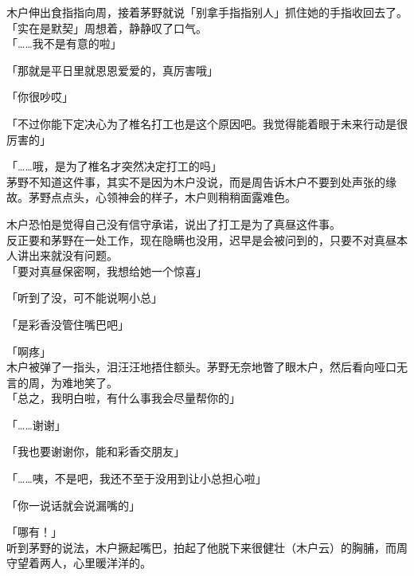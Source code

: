 木户伸出食指指向周，接着茅野就说「别拿手指指别人」抓住她的手指收回去了。「实在是默契」周想着，静静叹了口气。\\

「……我不是有意的啦」

「那就是平日里就恩恩爱爱的，真厉害哦」

「你很吵哎」

「不过你能下定决心为了椎名打工也是这个原因吧。我觉得能着眼于未来行动是很厉害的」

「……哦，是为了椎名才突然决定打工的吗」\\

茅野不知道这件事，其实不是因为木户没说，而是周告诉木户不要到处声张的缘故。茅野点点头，心领神会的样子，木户则稍稍面露难色。

木户恐怕是觉得自己没有信守承诺，说出了打工是为了真昼这件事。\\

反正要和茅野在一处工作，现在隐瞒也没用，迟早是会被问到的，只要不对真昼本人讲出来就没有问题。\\

「要对真昼保密啊，我想给她一个惊喜」

「听到了没，可不能说啊小总」

「是彩香没管住嘴巴吧」

「啊疼」\\

木户被弹了一指头，泪汪汪地捂住额头。茅野无奈地瞥了眼木户，然后看向哑口无言的周，为难地笑了。\\

「总之，我明白啦，有什么事我会尽量帮你的」

「……谢谢」

「我也要谢谢你，能和彩香交朋友」

「……咦，不是吧，我还不至于没用到让小总担心啦」

「你一说话就会说漏嘴的」

「哪有！」\\

听到茅野的说法，木户撅起嘴巴，拍起了他脱下来很健壮（木户云）的胸脯，而周守望着两人，心里暖洋洋的。
